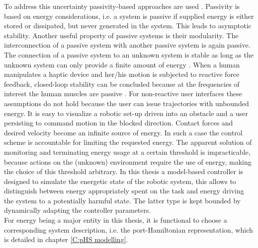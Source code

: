 \documentclass[a4paper,twoside, openright,12pt]{report}
\begin{document}
To address this uncertainty passivity-based approaches are used \cite{Hirche_12}. Passivity is based on energy considerations, i.e. a system is passive if supplied energy is either stored or dissipated, but never generated in the system. This leads to asymptotic stability. Another useful property of passive systems is their modularity. The interconnection of a passive system with another passive system is again passive. The connection of a passive system to an unknown system is stable as long as the unknown system can only provide a finite amount of energy \cite{Stramigioli_15}. When a human manipulates a haptic device and her/his motion is subjected to reactive force feedback, closed-loop stability can be concluded because at the frequencies of interest the human muscles are passive \cite{Hogan_89}. For non-reactive user interfaces these assumptions do not hold because the user can issue trajectories with unbounded energy. It is easy to visualize a robotic set-up driven into an obstacle and a user persisting to command motion in the blocked direction. Contact forces and desired velocity become an infinite source of energy. In such a case the control scheme is accountable for limiting the requested energy. The apparent solution of monitoring and terminating energy usage at a certain threshold is impracticable, because actions on the  (unknown) environment require the use of energy, making the choice of this threshold arbitrary. In this thesis a model-based controller is designed to simulate the energetic state of the robotic system, this allows to distinguish between energy appropriately spent on the task and energy driving the system to a potentially harmful state. The latter type is kept bounded by dynamically adapting the controller parameters.\\
For energy being a major entity in this thesis, it is functional to choose a corresponding system description, i.e. the port-Hamiltonian representation, which is detailed in chapter \ref{C:pHS modelling}.
\end{document}
